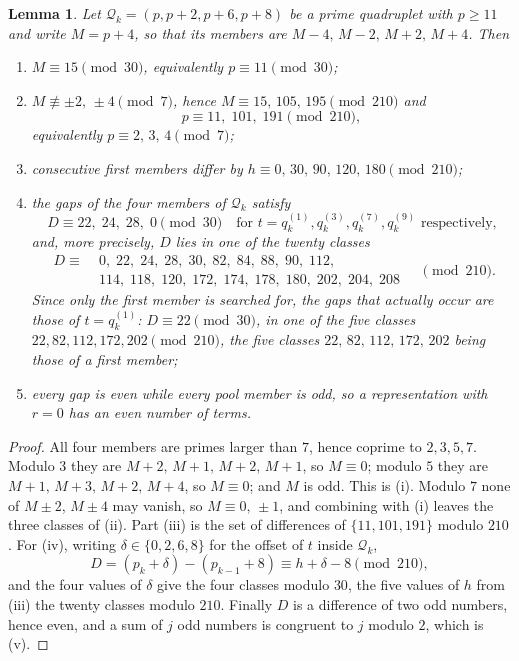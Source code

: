 \documentclass[11pt,a4paper]{article}
\newtheorem{lemma}{Lemma}
\newcommand{\Q}{\mathcal{Q}}
\begin{document}
\begin{lemma}
\label{lem:residues}
Let $\Q_k=(p,p+2,p+6,p+8)$ be a prime quadruplet with $p\ge11$ and write
$M=p+4$, so that its members are $M-4,\,M-2,\,M+2,\,M+4$. Then
\begin{enumerate}[label=(\roman*),nosep]
\item $M\equiv 15 \pmod{30}$, equivalently $p\equiv 11\pmod{30}$;
\item $M\not\equiv \pm2,\,\pm4 \pmod 7$, hence $M\equiv 15,\,105,\,195
  \pmod{210}$ and
  \[
  p\equiv 11,\;101,\;191 \pmod{210},
  \]
  equivalently $p\equiv 2,\,3,\,4 \pmod 7$;
\item consecutive first members differ by
  $h\equiv 0,\,30,\,90,\,120,\,180 \pmod{210}$;
\item the gaps of the four members of $\Q_k$ satisfy
  \[
  D\equiv 22,\;24,\;28,\;0 \pmod{30}
  \quad\text{for } t=q_k^{(1)},q_k^{(3)},q_k^{(7)},q_k^{(9)}
  \text{ respectively,}
  \]
  and, more precisely, $D$ lies in one of the twenty classes
  \[
  \begin{aligned}
  D\equiv\;&0,\;22,\;24,\;28,\;30,\;82,\;84,\;88,\;90,\;112,\\
           &114,\;118,\;120,\;172,\;174,\;178,\;180,\;202,\;204,\;208
  \end{aligned}
  \quad\pmod{210}.
  \]
  Since only the first member is searched for, the gaps that actually
  occur are those of $t=q_k^{(1)}$: $D\equiv22\pmod{30}$, in one of the
  five classes $22, 82, 112, 172, 202 \pmod{210}$,
  the five classes $22,\,82,\,112,\,172,\,202$ being those of a first
  member;
\item every gap is even while every pool member is odd, so a representation
  with $r=0$ has an even number of terms.
\end{enumerate}
\end{lemma}
\begin{proof}
All four members are primes larger than $7$, hence coprime to $2,3,5,7$.
Modulo $3$ they are $M+2,\,M+1,\,M+2,\,M+1$, so $M\equiv0$; modulo $5$ they
are $M+1,\,M+3,\,M+2,\,M+4$, so $M\equiv0$; and $M$ is odd. This is (i).
Modulo $7$ none of $M\pm2$, $M\pm4$ may vanish, so $M\equiv 0,\,\pm1$, and
combining with (i) leaves the three classes of (ii). Part (iii) is the set
of differences of $\{11,101,191\}$ modulo $210$. For (iv), writing
$\delta\in\{0,2,6,8\}$ for the offset of $t$ inside $\Q_k$,
\[
D=(p_k+\delta)-(p_{k-1}+8)\equiv h+\delta-8 \pmod{210},
\]
and the four values of $\delta$ give the four classes modulo $30$, the five
values of $h$ from (iii) the twenty classes modulo $210$. Finally $D$ is a
difference of two odd numbers, hence even, and a sum of $j$ odd numbers is
congruent to $j$ modulo $2$, which is (v).
\end{proof}
\end{document}
